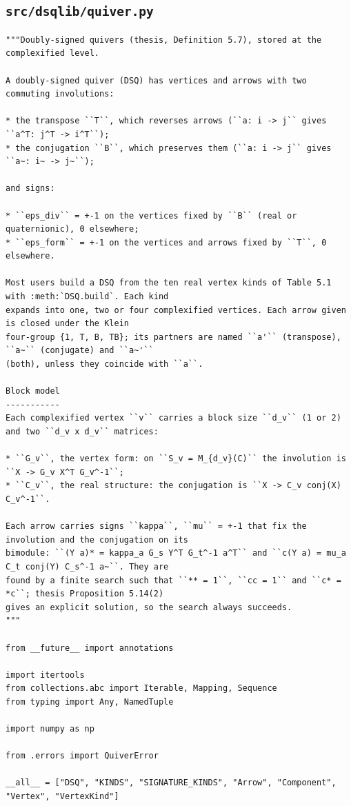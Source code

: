 \documentclass[12pt, a4paper]{report}
\theoremstyle{plain}
\theoremstyle{definition}
\theoremstyle{remark}
\theoremstyle{plain}
\begin{document}
\subsection{\texorpdfstring{\texttt{src/dsqlib/quiver.py}}{src/dsqlib/quiver.py}}
\begin{lstlisting}[style=dsqcode]
"""Doubly-signed quivers (thesis, Definition 5.7), stored at the complexified level.

A doubly-signed quiver (DSQ) has vertices and arrows with two commuting involutions:

* the transpose ``T``, which reverses arrows (``a: i -> j`` gives ``a^T: j^T -> i^T``);
* the conjugation ``B``, which preserves them (``a: i -> j`` gives ``a~: i~ -> j~``);

and signs:

* ``eps_div`` = +-1 on the vertices fixed by ``B`` (real or quaternionic), 0 elsewhere;
* ``eps_form`` = +-1 on the vertices and arrows fixed by ``T``, 0 elsewhere.

Most users build a DSQ from the ten real vertex kinds of Table 5.1 with :meth:`DSQ.build`. Each kind
expands into one, two or four complexified vertices. Each arrow given is closed under the Klein
four-group {1, T, B, TB}; its partners are named ``a'`` (transpose), ``a~`` (conjugate) and ``a~'``
(both), unless they coincide with ``a``.

Block model
-----------
Each complexified vertex ``v`` carries a block size ``d_v`` (1 or 2) and two ``d_v x d_v`` matrices:

* ``G_v``, the vertex form: on ``S_v = M_{d_v}(C)`` the involution is ``X -> G_v X^T G_v^-1``;
* ``C_v``, the real structure: the conjugation is ``X -> C_v conj(X) C_v^-1``.

Each arrow carries signs ``kappa``, ``mu`` = +-1 that fix the involution and the conjugation on its
bimodule: ``(Y a)* = kappa_a G_s Y^T G_t^-1 a^T`` and ``c(Y a) = mu_a C_t conj(Y) C_s^-1 a~``. They are
found by a finite search such that ``** = 1``, ``cc = 1`` and ``c* = *c``; thesis Proposition 5.14(2)
gives an explicit solution, so the search always succeeds.
"""

from __future__ import annotations

import itertools
from collections.abc import Iterable, Mapping, Sequence
from typing import Any, NamedTuple

import numpy as np

from .errors import QuiverError

__all__ = ["DSQ", "KINDS", "SIGNATURE_KINDS", "Arrow", "Component", "Vertex", "VertexKind"]


\end{lstlisting}
\end{document}
